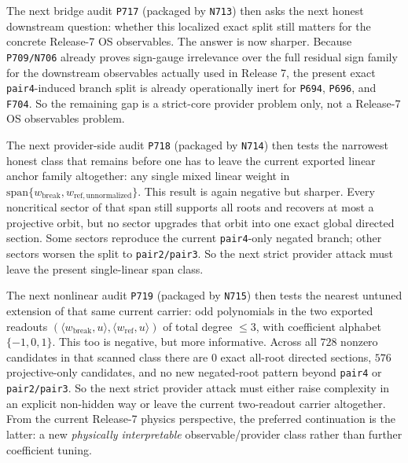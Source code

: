 \documentclass[11pt,a4paper]{article}
\begin{document}
The next bridge audit \texttt{P717} (packaged by \texttt{N713}) then asks the next honest downstream question: whether this localized
exact split still matters for the concrete Release-7 OS observables. The answer is now sharper. Because \texttt{P709/N706} already proves
sign-gauge irrelevance over the full residual sign family for the downstream observables actually used in Release 7, the present exact
\texttt{pair4}-induced branch split is already operationally inert for \texttt{P694}, \texttt{P696}, and \texttt{F704}. So the remaining
gap is a strict-core provider problem only, not a Release-7 OS observables problem.

The next provider-side audit \texttt{P718} (packaged by \texttt{N714}) then tests the narrowest honest class that remains before one
has to leave the current exported linear anchor family altogether: any single mixed linear weight in
\(\mathrm{span}\{w_{\mathrm{break}}, w_{\mathrm{ref,unnormalized}}\}\). This result is again negative but sharper. Every noncritical
sector of that span still supports all roots and recovers at most a projective orbit, but no sector upgrades that orbit into one exact
global directed section. Some sectors reproduce the current \texttt{pair4}-only negated branch; other sectors worsen the split to
\texttt{pair2/pair3}. So the next strict provider attack must leave the present single-linear span class.

The next nonlinear audit \texttt{P719} (packaged by \texttt{N715}) then tests the nearest untuned extension of that same current carrier:
odd polynomials in the two exported readouts \((\langle w_{\mathrm{break}},u\rangle,\langle w_{\mathrm{ref}},u\rangle)\) of total
degree \(\le 3\), with coefficient alphabet \(\{-1,0,1\}\). This too is negative, but more informative. Across all \(728\) nonzero
candidates in that scanned class there are \(0\) exact all-root directed sections, \(576\) projective-only candidates, and no new
negated-root pattern beyond \texttt{pair4} or \texttt{pair2/pair3}. So the next strict provider attack must either raise complexity in
an explicit non-hidden way or leave the current two-readout carrier altogether. From the current Release-7 physics perspective, the
preferred continuation is the latter: a new \emph{physically interpretable} observable/provider class rather than further coefficient tuning.
\end{document}
